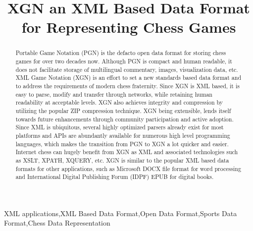 \documentclass[conference]{IEEEtran}
\begin{document}
\title{XGN \textendash  an XML Based Data Format\\for Representing Chess Games}
\author{
\and
{}
}
\maketitle
\begin{abstract}
Portable Game Notation (PGN) is the de\textendash facto open data format for storing chess games for over two decades now. Although PGN is compact and human readable, it does not facilitate storage of multilingual commentary, images, visualization data, etc. XML Game Notation (XGN) is an effort to set a new standards based data format and to address the requirements of modern chess fraternity. Since XGN is XML based, it is easy to parse, modify and transfer through networks, while retaining human readability at acceptable levels. XGN also achieves integrity and compression by utilizing the popular ZIP compression technique. XGN being extensible, lends itself towards future enhancements through community participation and active adoption. Since XML is ubiquitous, several highly optimized parsers already exist for most platforms and APIs are abundantly available for numerous high level programming languages, which makes the transition from PGN to XGN a lot quicker and easier. Internet chess can hugely benefit from XGN as XML and associated technologies such as XSLT, XPATH, XQUERY, etc. XGN is similar to the popular XML based data formats for other applications, such as Microsoft DOCX file format for word processing and International Digital Publishing Forum (IDPF) EPUB for digital books.
\end{abstract}

\begin{IEEEkeywords}
XML applications,XML Based Data Format,Open Data Format,Sports Data Format,Chess Data Representation

\end{IEEEkeywords}
\end{document}
